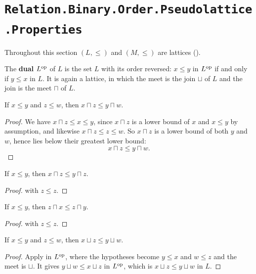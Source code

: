 \section{\texttt{Relation.Binary.Order.Pseudolattice.Properties}}

Throughout this section $(L, \le)$ and $(M, \le)$ are lattices ().

\begin{definition}
  \label{DualPseudolattice}
  The \textbf{dual} $L^{\mathrm{op}}$ of $L$ is the set $L$ with its order reversed: $x \le y$ in $L^{\mathrm{op}}$ if and only if $y \le x$ in $L$. It is again a lattice, in which the meet is the join $\sqcup$ of $L$ and the join is the meet $\sqcap$ of $L$.
\end{definition}

\begin{lemma}
  \label{meetMono}
  If $x \le y$ and $z \le w$, then $x \sqcap z \le y \sqcap w$.
\end{lemma}
\begin{proof}
  We have $x \sqcap z \le x \le y$, since $x \sqcap z$ is a lower bound of $x$ and $x \le y$ by assumption, and likewise $x \sqcap z \le z \le w$. So $x \sqcap z$ is a lower bound of both $y$ and $w$, hence lies below their greatest lower bound:
  \[
    x \sqcap z \le y \sqcap w.
  \]
\end{proof}

\begin{corollary}
  \label{meetMonoR}
  If $x \le y$, then $x \sqcap z \le y \sqcap z$.
\end{corollary}
\begin{proof}
   with $z \le z$.
\end{proof}

\begin{corollary}
  \label{meetMonoL}
  If $x \le y$, then $z \sqcap x \le z \sqcap y$.
\end{corollary}
\begin{proof}
   with $z \le z$.
\end{proof}

\begin{lemma}
  \label{joinMono}
  If $x \le y$ and $z \le w$, then $x \sqcup z \le y \sqcup w$.
\end{lemma}
\begin{proof}
  Apply  in $L^{\mathrm{op}}$, where the hypotheses become $y \le x$ and $w \le z$ and the meet is $\sqcup$. It gives $y \sqcup w \le x \sqcup z$ in $L^{\mathrm{op}}$, which is $x \sqcup z \le y \sqcup w$ in $L$.
\end{proof}

